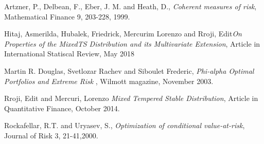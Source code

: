 \documentclass[12pt]{article}
\begin{document}
\begin{thebibliography}{10} %

	
 Artzner, P., Delbean, F., Eber, J. M. and Heath, D.,  \emph{Coherent measures of risk}, Mathematical Finance 9, 203-228, 1999.

 Hitaj, Asmerilda, Hubalek, Friedrick, Mercurim  Lorenzo
and Rroji, Edit\emph{On Properties of the MixedTS Distribution and its Multivariate Extension}, Article in International Statiscal Review, May 2018	
	
 Martin R. Douglas, Svetlozar Rachev and Siboulet Frederic, \emph{Phi-alpha Optimal Portfolios and Extreme Risk }, Wilmott magazine, November 2003.


 Rroji, Edit and Mercuri, Lorenzo \emph{Mixed Tempered Stable Distribution}, Article in Quantitative Finance, October 2014.


 Rockafellar, R.T. and Uryasev, S., \emph{Optimization of conditional value-at-risk},
Journal of Risk 3, 21-41,2000.








\end{thebibliography}

\newpage
 


\tableofcontents



\end{document}
